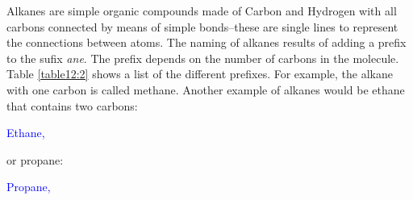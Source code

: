 \documentclass[main.tex]{subfiles}
\begin{document}
\begin{description}
\begin{marginfigure}[2cm]
\end{marginfigure}
   \begin{marginfigure}[2cm]
\label{fig:marginfig1}
\end{marginfigure}

\item[\docfilehook{  Alkanes}{Alkanes}] Alkanes are simple organic compounds made of Carbon and Hydrogen with all carbons connected by means of simple bonds--these are single lines to represent the connections between atoms. The naming of alkanes results of adding a prefix to the sufix \emph{ane}. The prefix depends on the number of carbons in the molecule. Table \ref{table12:2} shows a list of the different prefixes. For example, the alkane with one carbon is called methane. Another example of alkanes would be ethane that contains two carbons:
\begin{center} \hspace{0.5cm}\textcolor{blue}{Ethane, }\end{center}
or propane:
\begin{center} \hspace{0.5cm}\textcolor{blue}{Propane, }\end{center}













\end{description}
\end{document}
